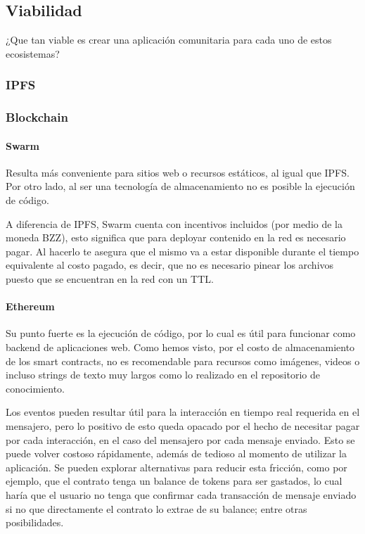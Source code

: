 \subsection{Viabilidad} 

¿Que tan viable es crear una aplicación comunitaria para cada uno de estos ecosistemas?

\subsubsection{IPFS}

\subsubsection{Blockchain}

\paragraph{Swarm}
Resulta más conveniente para sitios web o recursos estáticos, al igual que IPFS. Por otro lado, al ser una tecnología de almacenamiento no es posible la ejecución de código. 

A diferencia de IPFS, Swarm cuenta con incentivos incluidos (por medio de la moneda BZZ), esto significa que para deployar contenido en la red es necesario pagar. Al hacerlo te asegura que el mismo va a estar disponible durante el tiempo equivalente al costo pagado, es decir, que no es necesario pinear los archivos puesto que se encuentran en la red con un TTL.

\paragraph{Ethereum}
Su punto fuerte es la ejecución de código, por lo cual es útil para funcionar como backend de aplicaciones web. Como hemos visto, por el costo de almacenamiento de los smart contracts, no es recomendable para recursos como imágenes, videos o incluso strings de texto muy largos como lo realizado en el repositorio de conocimiento. 

Los eventos pueden resultar útil para la interacción en tiempo real requerida en el mensajero, pero lo positivo de esto queda opacado por el hecho de necesitar pagar por cada interacción, en el caso del mensajero por cada mensaje enviado. Esto se puede volver costoso rápidamente, además de tedioso al momento de utilizar la aplicación. Se pueden explorar alternativas para reducir esta fricción, como por ejemplo, que el contrato tenga un balance de tokens para ser gastados, lo cual haría que el usuario no tenga que confirmar cada transacción de mensaje enviado si no que directamente el contrato lo extrae de su balance; entre otras posibilidades.

